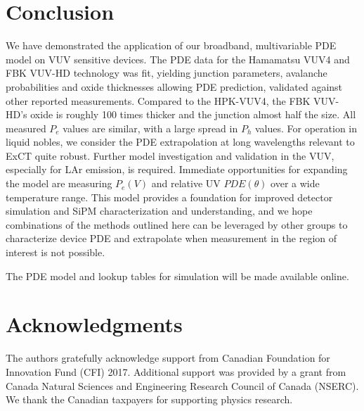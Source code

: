 \section{Conclusion}

We have demonstrated the application of our broadband, multivariable PDE model on VUV sensitive devices. The PDE data for the Hamamatsu VUV4 and FBK VUV-HD technology was fit, yielding junction parameters, avalanche probabilities and oxide thicknesses allowing PDE prediction, validated against other reported measurements. Compared to the HPK-VUV4, the FBK VUV-HD's oxide is roughly 100 times thicker and the junction almost half the size. All measured $P_e$ values are similar, with a large spread in $P_h$ values. For operation in liquid nobles, we consider the PDE extrapolation at long wavelengths relevant to ExCT quite robust. Further model investigation and validation in the VUV, especially for LAr emission, is required. Immediate opportunities for expanding the model are measuring $P_e(V)$ and relative UV $PDE(\theta)$ over a wide temperature range. This model provides a foundation for improved detector simulation and SiPM characterization and understanding, and we hope combinations of the methods outlined here can be leveraged by other groups to characterize device PDE and extrapolate when measurement in the region of interest is not possible.  

The PDE model and lookup tables for simulation will be made available online.


\section*{Acknowledgments}
The authors gratefully acknowledge support from Canadian Foundation for Innovation Fund (CFI) 2017. Additional support was provided by a grant from Canada Natural Sciences and Engineering Research Council of Canada (NSERC). We thank the Canadian taxpayers for supporting physics research.